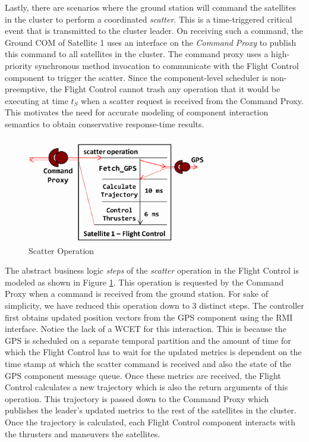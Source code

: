 Lastly, there are scenarios where the ground station will command the satellites in the cluster to perform a coordinated \emph{scatter}. This is a time-triggered critical event that is transmitted to the cluster leader. On receiving such a command, the Ground COM of Satellite 1 uses an interface on the \emph{Command Proxy} to publish this command to all satellites in the cluster. The command proxy uses a high-priority synchronous method invocation to communicate with the Flight Control component to trigger the scatter. Since the component-level scheduler is non-preemptive, the Flight Control cannot trash any operation that it would be executing at time $t_S$ when a scatter request is received from the Command Proxy. This motivates the need for accurate modeling of component interaction semantics to obtain conservative response-time results. 

\begin{figure}[htb]
	\centering
	\includegraphics[width=0.7\textwidth]{./img/scatter.jpg}
	\caption{Scatter Operation}
	\label{fig:FLC}
\end{figure}

The abstract business logic \emph{steps} of the \emph{scatter} operation in the Flight Control is modeled as shown in Figure \ref{fig:FLC}. This operation is requested by the Command Proxy when a command is received from the ground station. For sake of simplicity, we have reduced this operation down to 3 distinct steps. The controller first obtains updated position vectors from the GPS component using the RMI interface. Notice the lack of a WCET for this interaction. This is because the GPS is scheduled on a separate temporal partition and the amount of time for which the Flight Control has to wait for the updated metrics is dependent on the time stamp at which the scatter command is received and also the state of the GPS component message queue. Once these metrics are received, the Flight Control calculates a new trajectory which is also the return arguments of this operation. This trajectory is passed down to the Command Proxy which publishes the leader's updated metrics to the rest of the satellites in the cluster. Once the trajectory is calculated, each Flight Control component interacts with the thrusters and maneuvers the satellites.  


